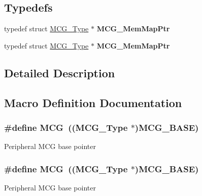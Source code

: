 \subsection*{Typedefs}
\begin{DoxyCompactItemize}
\item 
typedef struct \hyperlink{structMCG__Type}{M\+C\+G\+\_\+\+Type} $\ast$ {\bfseries M\+C\+G\+\_\+\+Mem\+Map\+Ptr}\hypertarget{group__MCG__Peripheral__Access__Layer_ga986eade1fbde340a81eb11bda1a7bba4}{}\label{group__MCG__Peripheral__Access__Layer_ga986eade1fbde340a81eb11bda1a7bba4}

\item 
typedef struct \hyperlink{structMCG__Type}{M\+C\+G\+\_\+\+Type} $\ast$ {\bfseries M\+C\+G\+\_\+\+Mem\+Map\+Ptr}\hypertarget{group__MCG__Peripheral__Access__Layer_ga986eade1fbde340a81eb11bda1a7bba4}{}\label{group__MCG__Peripheral__Access__Layer_ga986eade1fbde340a81eb11bda1a7bba4}

\end{DoxyCompactItemize}


\subsection{Detailed Description}


\subsection{Macro Definition Documentation}
\subsubsection[{\texorpdfstring{M\+CG}{MCG}}]{\setlength{\rightskip}{0pt plus 5cm}\#define M\+CG~(({\bf M\+C\+G\+\_\+\+Type} $\ast$){\bf M\+C\+G\+\_\+\+B\+A\+SE})}\hypertarget{group__MCG__Peripheral__Access__Layer_gad7ea2d93cafdbe9298ef1dd52be44f88}{}\label{group__MCG__Peripheral__Access__Layer_gad7ea2d93cafdbe9298ef1dd52be44f88}
Peripheral M\+CG base pointer 
\subsubsection[{\texorpdfstring{M\+CG}{MCG}}]{\setlength{\rightskip}{0pt plus 5cm}\#define M\+CG~(({\bf M\+C\+G\+\_\+\+Type} $\ast$){\bf M\+C\+G\+\_\+\+B\+A\+SE})}\hypertarget{group__MCG__Peripheral__Access__Layer_gad7ea2d93cafdbe9298ef1dd52be44f88}{}\label{group__MCG__Peripheral__Access__Layer_gad7ea2d93cafdbe9298ef1dd52be44f88}
Peripheral M\+CG base pointer 
